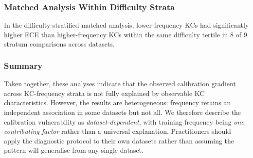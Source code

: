 \subsubsection*{Matched Analysis Within Difficulty Strata}
In the difficulty-stratified matched analysis, lower-frequency KCs had significantly higher ECE than higher-frequency KCs within the same difficulty tertile in 8 of 9 stratum comparisons across datasets.

\subsubsection*{Summary}
Taken together, these analyses indicate that the observed calibration gradient across KC-frequency strata is not fully explained by observable KC characteristics.
However, the results are heterogeneous: frequency retains an independent association in some datasets but not all.
We therefore describe the calibration vulnerability as \emph{dataset-dependent}, with training frequency being \emph{one contributing factor} rather than a universal explanation.
Practitioners should apply the diagnostic protocol to their own datasets rather than assuming the pattern will generalise from any single dataset.